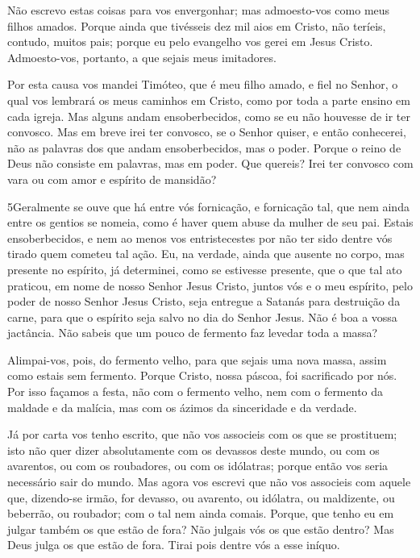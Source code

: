 Não escrevo estas coisas para vos envergonhar; mas admoesto-vos
como meus filhos amados. Porque ainda que tivésseis dez mil
aios em Cristo, não teríeis, contudo, muitos pais; porque eu pelo
evangelho vos gerei em Jesus Cristo. Admoesto-vos, portanto,
a que sejais meus imitadores.

Por esta causa vos mandei Timóteo, que é meu filho amado, e fiel
no Senhor, o qual vos lembrará os meus caminhos em Cristo, como por
toda a parte ensino em cada igreja. Mas alguns andam
ensoberbecidos, como se eu não houvesse de ir ter convosco.
Mas em breve irei ter convosco, se o Senhor quiser, e então
conhecerei, não as palavras dos que andam ensoberbecidos, mas o
poder. Porque o reino de Deus não consiste em palavras, mas
em poder. Que quereis? Irei ter convosco com vara ou com amor
e espírito de mansidão?

\medskip

\lettrine{5} Geralmente se ouve que há entre vós fornicação, e
fornicação tal, que nem ainda entre os gentios se nomeia, como é
haver quem abuse da mulher de seu pai. Estais ensoberbecidos, e
nem ao menos vos entristecestes por não ter sido dentre vós tirado
quem cometeu tal ação. Eu, na verdade, ainda que ausente no
corpo, mas presente no espírito, já determinei, como se estivesse
presente, que o que tal ato praticou, em nome de nosso Senhor
Jesus Cristo, juntos vós e o meu espírito, pelo poder de nosso
Senhor Jesus Cristo, seja entregue a Satanás para destruição da
carne, para que o espírito seja salvo no dia do Senhor Jesus.
Não é boa a vossa jactância. Não sabeis que um pouco de fermento
faz levedar toda a massa?

Alimpai-vos, pois, do fermento velho, para que sejais uma nova
massa, assim como estais sem fermento. Porque Cristo, nossa páscoa,
foi sacrificado por nós. Por isso façamos a festa, não com o
fermento velho, nem com o fermento da maldade e da malícia, mas com
os ázimos da sinceridade e da verdade.

Já por carta vos tenho escrito, que não vos associeis com os que
se prostituem; isto não quer dizer absolutamente com os
devassos deste mundo, ou com os avarentos, ou com os roubadores, ou
com os idólatras; porque então vos seria necessário sair do mundo.
Mas agora vos escrevi que não vos associeis com aquele que,
dizendo-se irmão, for devasso, ou avarento, ou idólatra, ou
maldizente, ou beberrão, ou roubador; com o tal nem ainda comais.
Porque, que tenho eu em julgar também os que estão de fora?
Não julgais vós os que estão dentro? Mas Deus julga os que
estão de fora. Tirai pois dentre vós a esse iníquo.

